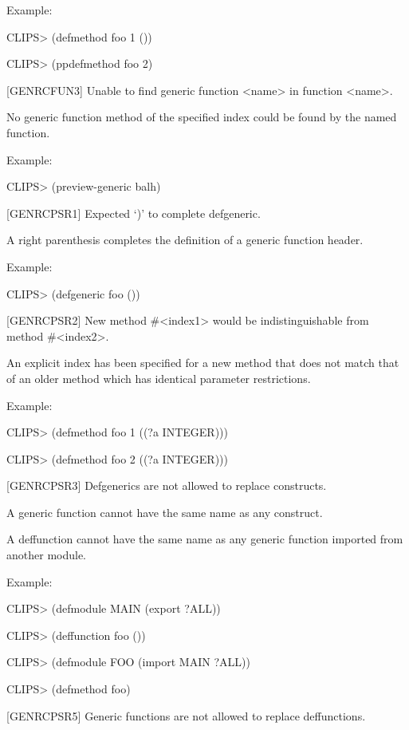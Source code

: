 \documentclass[letterpaper,10pt,english]{sphinxmanual}
\begin{document}
Example:

CLIPS\textgreater{} (defmethod foo 1 ())

CLIPS\textgreater{} (ppdefmethod foo 2)

{[}GENRCFUN3{]} Unable to find generic function \textless{}name\textgreater{} in function \textless{}name\textgreater{}.

No generic function method of the specified index could be found by the
named function.

Example:

CLIPS\textgreater{} (preview-generic balh)

{[}GENRCPSR1{]} Expected ‘)’ to complete defgeneric.

A right parenthesis completes the definition of a generic function
header.

Example:

CLIPS\textgreater{} (defgeneric foo ())

{[}GENRCPSR2{]} New method \#\textless{}index1\textgreater{} would be indistinguishable from method
\#\textless{}index2\textgreater{}.

An explicit index has been specified for a new method that does not
match that of an older method which has identical parameter
restrictions.

Example:

CLIPS\textgreater{} (defmethod foo 1 ((?a INTEGER)))

CLIPS\textgreater{} (defmethod foo 2 ((?a INTEGER)))

{[}GENRCPSR3{]} Defgenerics are not allowed to replace constructs.

A generic function cannot have the same name as any construct.


A deffunction cannot have the same name as any generic function imported
from another module.

Example:

CLIPS\textgreater{} (defmodule MAIN (export ?ALL))

CLIPS\textgreater{} (deffunction foo ())

CLIPS\textgreater{} (defmodule FOO (import MAIN ?ALL))

CLIPS\textgreater{} (defmethod foo)

{[}GENRCPSR5{]} Generic functions are not allowed to replace deffunctions.
\end{document}
